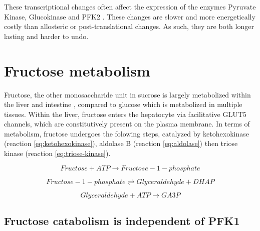\documentclass{tufte-handout}
\begin{document}
These transcriptional changes often affect the expression of the enzymes Pyruvate Kinase, Glucokinase and PFK2 \citep{Semenza1994,Kawaguchi2001}.  These changes are slower and more energetically costly than allosteric or post-translational changes.  As such, they are both longer lasting and harder to undo.

\section{Fructose metabolism}

Fructose, the other monosaccharide unit in sucrose is largely metabolized within the liver and intestine  , compared to glucose which is metabolized in multiple tissues.  Within the liver, fructose enters the hepatocyte via facilitative GLUT5 channels, which are constitutively present on the plasma membrane.  In terms of metabolism, fructose undergoes the folowing steps, catalyzed by ketohexokinase (reaction \ref{eq:ketohexokinase}), aldolase B (reaction \ref{eq:aldolase}) then triose kinase (reaction \ref{eq:triose-kinase}).

\begin{equation}\label{eq:ketohexokinase}
Fructose + ATP \rightarrow Fructose-1-phosphate
\end{equation}

\begin{equation}\label{eq:aldolase}
Fructose-1-phosphate \rightleftharpoons Glyceraldehyde + DHAP
\end{equation}

\begin{equation}\label{eq:triose-kinase}
Glyceraldehyde + ATP \rightarrow GA3P
\end{equation}


\subsection{Fructose catabolism is independent of PFK1}
\end{document}
